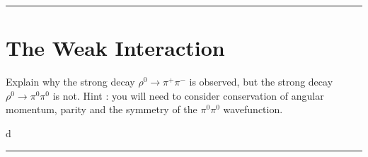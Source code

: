 
\noindent\rule{7in}{2.8pt}
\section{The Weak Interaction}
    
\begin{problem}{11.1}
Explain why the strong decay $\rho^0\to\pi^+\pi^-$ is observed, but the strong decay $\rho^0\to\pi^0\pi^0$ is not.
Hint : you will need to consider conservation of angular momentum, parity and the symmetry of the $\pi^0\pi^0$ wavefunction.
\end{problem}
\begin{solution}
d
\end{solution}

\noindent\rule{7in}{1.5pt}



